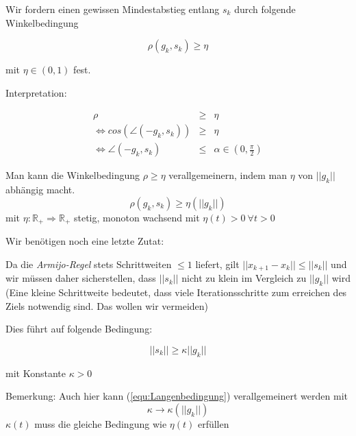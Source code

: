 \documentclass[10pt,a4paper]{article}
\begin{document}
\begin{defi}[Winkelbedingung]
Wir fordern einen gewissen Mindestabstieg entlang $s_k$ durch folgende Winkelbedingung


\begin{equation}
\rho(g_k,s_k)\geq \eta 
\label{eqn:Winkelbedingung}
\end{equation}

mit $\eta \in (0,1)$ fest.

Interpretation: 

\begin{eqnarray*}
\rho &\geq& \eta \\
\Leftrightarrow cos(\angle (-g_k,s_k)) &\geq& \eta \\
\Leftrightarrow \angle(-g_k,s_k) &\leq & \alpha \in (0,\frac{\pi}{2})
\end{eqnarray*}
\end{defi}


\begin{defi}

Man kann die Winkelbedingung $\rho \geq \eta$ verallgemeinern, indem man $\eta$ von $||g_k||$ abhängig macht. $$\rho(g_k,s_k) \geq \eta(||g_k||)$$ mit $\eta: \mathbb{R}_{+} \Rightarrow \mathbb{R}_{+}$ stetig, monoton wachsend mit $\eta(t)>0 ~ \forall t > 0$


\end{defi}

Wir benötigen noch eine letzte Zutat:

Da die \emph{Armijo-Regel} stets Schrittweiten $\leq 1$ liefert, gilt $||x_{k+1}-x_k|| \leq ||s_k||$ und wir müssen daher sicherstellen, dass $||s_k||$ nicht zu klein im Vergleich zu $||g_k||$ wird (Eine kleine Schrittweite bedeutet, dass viele Iterationsschritte zum erreichen des Ziels notwendig sind. Das wollen wir vermeiden)

Dies führt auf folgende Bedingung:

\begin{defi}

\begin{equation}
||s_k|| \geq \kappa ||g_k||
\label{equ:Langenbedingung}
\end{equation}

mit Konstante $\kappa > 0$

Bemerkung: Auch hier kann (\ref{equ:Langenbedingung}) verallgemeinert werden mit $$\kappa \rightarrow \kappa(||g_k||)$$ $\kappa(t)$ muss die gleiche Bedingung wie $\eta(t)$ erfüllen

\end{defi}
\end{document}
